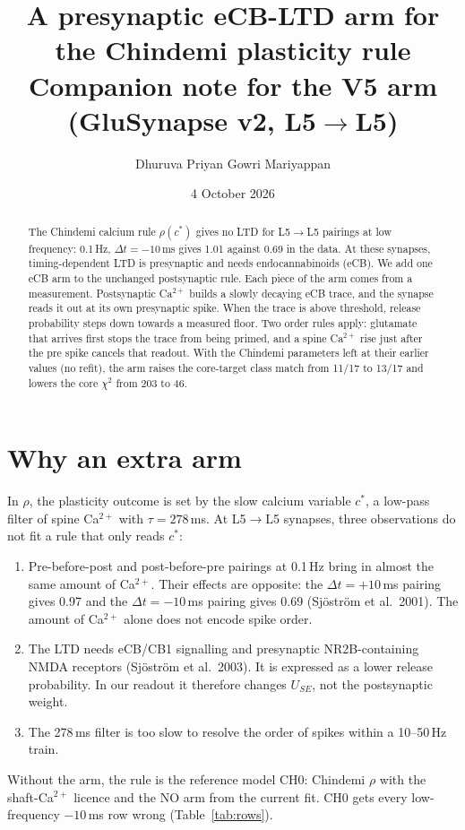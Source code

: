 \documentclass[11pt]{article}
\title{A presynaptic eCB-LTD arm for the Chindemi plasticity rule\\[0.3em]
\large Companion note for the V5 arm (GluSynapse v2, L5$\to$L5)}
\author{Dhuruva Priyan Gowri Mariyappan}
\date{4 October 2026}
\newcommand{\cstar}{c^{*}}
\begin{document}
\maketitle

\begin{abstract}
The Chindemi calcium rule $\rho(\cstar)$ gives no LTD for L5$\to$L5 pairings at low frequency: 0.1\,Hz,
$\Delta t=-10$\,ms gives 1.01 against 0.69 in the data. At these synapses, timing-dependent LTD is presynaptic and
needs endocannabinoids (eCB). We add one eCB arm to the unchanged postsynaptic rule. Each piece of the arm comes from
a measurement. Postsynaptic Ca$^{2+}$ builds a slowly decaying eCB trace, and the synapse reads it out at its own
presynaptic spike. When the trace is above threshold, release probability steps down towards a measured floor. Two
order rules apply: glutamate that arrives first stops the trace from being primed, and a spine Ca$^{2+}$ rise just
after the pre spike cancels that readout. With the Chindemi parameters left at their earlier values (no refit), the arm
raises the core-target class match from 11/17 to 13/17 and lowers the core $\chi^2$ from 203 to 46.
\end{abstract}

\section{Why an extra arm}
In $\rho$, the plasticity outcome is set by the slow calcium variable $\cstar$, a low-pass filter of spine
Ca$^{2+}$ with $\tau=278$\,ms. At L5$\to$L5 synapses, three observations do not fit a rule that only reads $\cstar$:
\begin{enumerate}
  \item Pre-before-post and post-before-pre pairings at 0.1\,Hz bring in almost the same amount of Ca$^{2+}$. Their
        effects are opposite: the $\Delta t=+10$\,ms pairing gives 0.97 and the $\Delta t=-10$\,ms pairing gives 0.69
        (Sj\"ostr\"om et al.\ 2001). The amount of Ca$^{2+}$ alone does not encode spike order.
  \item The LTD needs eCB/CB1 signalling and presynaptic NR2B-containing NMDA receptors
        (Sj\"ostr\"om et al.\ 2003). It is expressed as a lower release probability. In our readout it therefore
        changes $U_{SE}$, not the postsynaptic weight.
  \item The 278\,ms filter is too slow to resolve the order of spikes within a 10--50\,Hz train.
\end{enumerate}
Without the arm, the rule is the reference model CH0: Chindemi $\rho$ with the shaft-Ca$^{2+}$ licence and the NO arm
from the current fit. CH0 gets every low-frequency $-10$\,ms row wrong (Table~\ref{tab:rows}).
\end{document}
